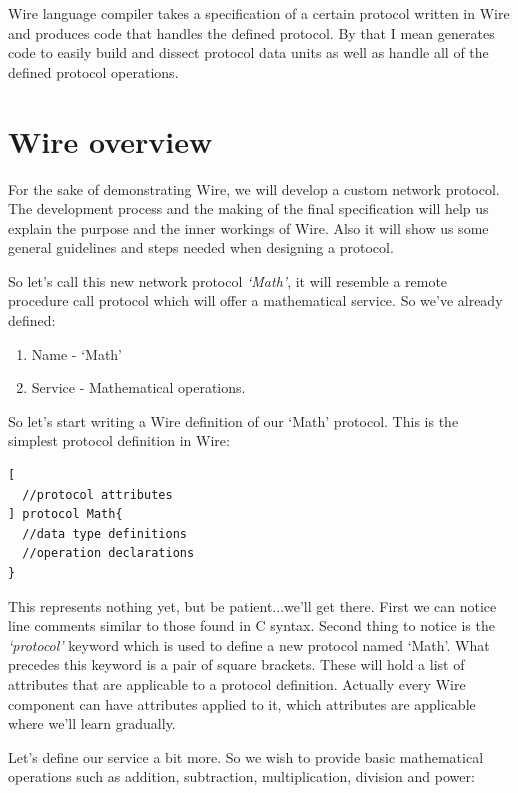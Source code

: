 \documentclass[times, utf8, diplomski]{fer}
\begin{document}
Wire language compiler takes a specification of a certain protocol written in 
Wire and produces code that handles the defined protocol. By that I mean generates 
code to easily build and dissect protocol data units as well as handle all of the 
defined protocol operations.

\section{Wire overview}
For the sake of demonstrating Wire, we will develop a custom network protocol. 
The development process and the making of the final specification will help us 
explain the purpose and the inner workings of Wire. Also it will show us some 
general guidelines and steps needed when designing a protocol.

So let's call this new network protocol \emph{`Math'}, it will resemble a remote 
procedure call protocol which will offer a mathematical service. 
So we've already defined:
\begin{enumerate}
	\item Name - `Math'
	\item Service - Mathematical operations.
\end{enumerate}

So let's start writing a Wire definition of our `Math' protocol. 
This is the simplest protocol definition in Wire:
\lstset{language=IDL}
\lstset{basicstyle=\tiny}
\lstset{numbers=left, numberstyle=\tiny, stepnumber=1, numbersep=5pt}
\begin{lstlisting}[frame=tb]
[
  //protocol attributes
] protocol Math{
  //data type definitions
  //operation declarations
}
\end{lstlisting}

This represents nothing yet, but be patient...we'll get there. First we can notice 
line comments similar to those found in C syntax. Second thing to notice is the 
\emph{`protocol'} keyword which is used to define a new protocol named `Math'. 
What precedes this keyword is a pair of square brackets. These will hold a list 
of attributes that are applicable to a protocol definition. Actually every Wire 
component can have attributes applied to it, which attributes are applicable 
where we'll learn gradually.

Let's define our service a bit more. So we wish to provide basic mathematical 
operations such as addition, subtraction, multiplication, division and power:
\end{document}
